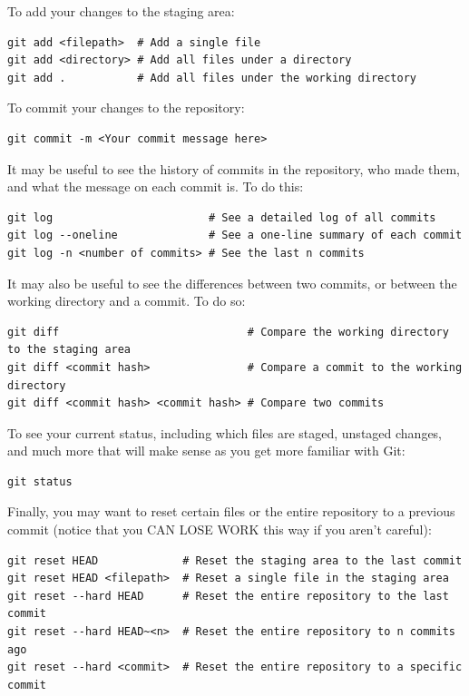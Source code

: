 \documentclass[fleqn]{article}
\begin{document}
To add your changes to the staging area:
\begin{lstlisting}
git add <filepath>  # Add a single file
git add <directory> # Add all files under a directory
git add .           # Add all files under the working directory
\end{lstlisting}

To commit your changes to the repository:
\begin{lstlisting}
git commit -m <Your commit message here>
\end{lstlisting}

It may be useful to see the history of commits in the repository, who made them,
and what the message on each commit is. To do this:

\begin{lstlisting}
git log                        # See a detailed log of all commits
git log --oneline              # See a one-line summary of each commit
git log -n <number of commits> # See the last n commits
\end{lstlisting}

It may also be useful to see the differences between two commits, or between
the working directory and a commit. To do so:

\begin{lstlisting}
git diff                             # Compare the working directory to the staging area
git diff <commit hash>               # Compare a commit to the working directory
git diff <commit hash> <commit hash> # Compare two commits
\end{lstlisting}

To see your current status, including which files are staged, unstaged changes,
and much more that will make sense as you get more familiar with Git:

\begin{lstlisting}
git status
\end{lstlisting}

Finally, you may want to reset certain files or the entire repository to a
previous commit (notice that you CAN LOSE WORK this way if you aren't careful):

\begin{lstlisting}
git reset HEAD             # Reset the staging area to the last commit
git reset HEAD <filepath>  # Reset a single file in the staging area
git reset --hard HEAD      # Reset the entire repository to the last commit
git reset --hard HEAD~<n>  # Reset the entire repository to n commits ago
git reset --hard <commit>  # Reset the entire repository to a specific commit
\end{lstlisting}
\end{document}

